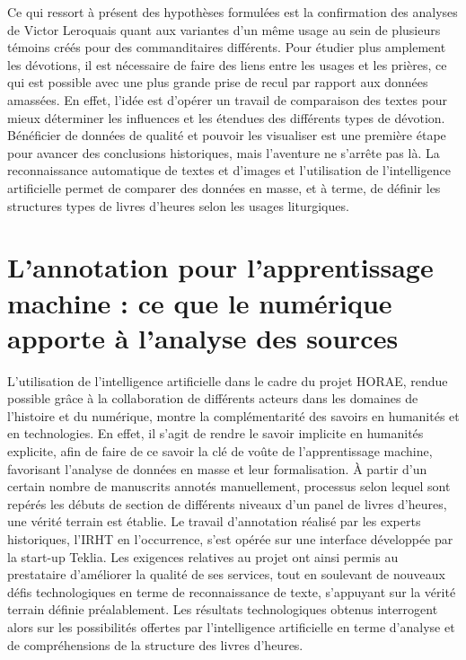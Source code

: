 \documentclass[a4paper,12pt,twoside]{book}
\begin{document}
Ce qui ressort à présent des hypothèses formulées est la confirmation des analyses de Victor Leroquais quant aux variantes d'un même usage au sein de plusieurs témoins créés pour des commanditaires différents. Pour étudier plus amplement les dévotions, il est nécessaire de faire des liens entre les usages et les prières, ce qui est possible avec une plus grande prise de recul par rapport aux données amassées. En effet, l'idée est d'opérer un travail de comparaison des textes pour mieux déterminer les influences et les étendues des différents types de dévotion. \\

Bénéficier de données de qualité et pouvoir les visualiser est une première étape pour avancer des conclusions historiques, mais l’aventure ne s’arrête pas là. La reconnaissance automatique de textes et d’images et l'utilisation de l'intelligence artificielle permet de comparer des données en masse, et à terme, de définir les structures types de livres d’heures selon les usages liturgiques.

	
	\chapter{\label{ML}L’annotation pour l’apprentissage machine : ce que le numérique apporte à l’analyse des sources}
	
	L'utilisation de l'intelligence artificielle dans le cadre du projet HORAE, rendue possible grâce à la collaboration de différents acteurs dans les domaines de l'histoire et du numérique, montre la complémentarité des savoirs en humanités et en technologies. En effet,  il s'agit de rendre le savoir implicite en humanités explicite, afin de faire de ce savoir la clé de voûte de l'apprentissage machine, favorisant l'analyse de données en masse et leur formalisation. À partir d'un certain nombre de manuscrits annotés manuellement, processus selon lequel sont repérés les débuts de section de différents niveaux d'un panel de livres d'heures, une vérité terrain est établie. Le travail d'annotation réalisé par les experts historiques, l'IRHT en l'occurrence, s'est opérée sur une interface développée par la start-up Teklia. Les exigences relatives au projet ont ainsi permis au prestataire d'améliorer la qualité de ses services, tout en soulevant de nouveaux défis technologiques en terme de reconnaissance de texte, s'appuyant sur la vérité terrain définie préalablement. Les résultats technologiques obtenus interrogent alors sur les possibilités offertes par l'intelligence artificielle en terme d'analyse et de compréhensions de la structure des livres d'heures.
	
\end{document}
